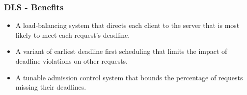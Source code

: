 \documentclass{beamer}
\newcommand{\myv}{\vspace{3 mm}}
\begin{document}
\begin{frame}
  \frametitle{DLS - Benefits}
  \begin{itemize}
  \item A load-balancing system that directs each client to the server that is
    most likely to meet each request's deadline.
    \myv
  \item A variant of earliest deadline first scheduling that limits the impact
    of deadline violations on other requests.
    \myv
  \item A tunable admission control system that bounds the percentage of
    requests missing their deadlines.
  \end{itemize}
\end{frame}

\end{document}
